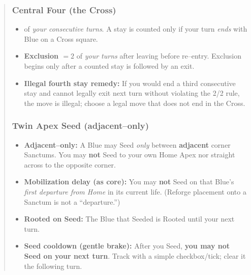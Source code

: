 \documentclass[11pt]{article}
\begin{document}
\begin{quote}
\subsubsection*{Central Four (the Cross)}
\begin{itemize}[leftmargin=1.3em,itemsep=0.2em]
  \item {} of \emph{your consecutive turns}. A stay is counted only if your turn \emph{ends} with Blue on a Cross square.
  \item \textbf{Exclusion $=2$} of \emph{your turns} after leaving before re–entry. Exclusion begins only after a counted stay is followed by an exit.
  \item \textbf{Illegal fourth stay remedy:} If you would end a third consecutive stay and cannot legally exit next turn without violating the 2/2 rule, the move is illegal; choose a legal move that does not end in the Cross.
\end{itemize}

\subsubsection*{Twin Apex Seed (adjacent–only)}
\begin{itemize}[leftmargin=1.3em,itemsep=0.25em]
  \item \textbf{Adjacent–only:} A Blue may Seed \emph{only} between \textbf{adjacent} corner Sanctums. You may \textbf{not} Seed to your own Home Apex nor straight across to the opposite corner.
  \item \textbf{Mobilization delay (as core):} You may \textbf{not} Seed on that Blue’s \emph{first departure from Home} in its current life. (Reforge placement onto a Sanctum is not a “departure.”)
  \item \textbf{Rooted on Seed:} The Blue that Seeded is Rooted until your next turn.
  \item \textbf{Seed cooldown (gentle brake):} After you Seed, \textbf{you may not Seed on your next turn}. Track with a simple checkbox/tick; clear it the following turn.
\end{itemize}


\end{quote}
\end{document}
